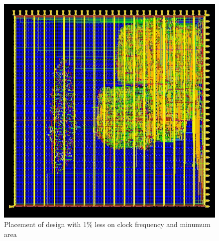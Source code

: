 \begin{figure}[!htbp]
\centering
\captionsetup{justification=centering}
\includegraphics[scale=0.6,angle=0]{../project/physical_design/images_1_minarea/DLX_IR_SIZE32_PC_SIZE32_1_minarea_place_prerouting.jpg}
\caption{Placement of design with 1\% less on clock frequency and minumum area}
\label{fig:plac1minarea}
\end{figure}
